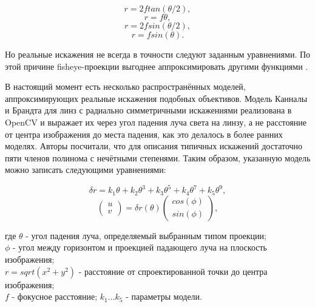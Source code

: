 \begin{eqseries}
    \begin{equation}
        \label{fy1}
    r = 2 f tan(\theta/2),  
    \end{equation}
    \begin{equation}
        \label{fy2}
    r = f \theta,
    \end{equation}
    \begin{equation}
        \label{fy3}
    r = 2 f sin(\theta/2),
    \end{equation}
    \begin{equation}
        \label{fy4}
    r = f sin(\theta).
    \end{equation}
\end{eqseries}    

Но реальные искажения не всегда в точности следуют заданным уравнениями.
По этой причине fisheye-проекции выгоднее аппроксимировать другими функциями \cite{opencv_model}.

В настоящий момент есть несколько распространённых моделей, аппроксимирующих реальные искажения подобных объективов. Модель Канналы и 
Брандта \cite{opencv_model} для линз с радиально симметричными искажениями реализована в OpenCV и выражает их через угол падения луча света на линзу, а не расстояние  
от центра изображения до места падения, как это делалось в более ранних моделях. Авторы посчитали, что для описания типичных искажений достаточно 
пяти членов полинома с нечётными степенями. Таким образом, указанную модель можно записать следующими уравнениями:
\begin{eqseries}
    \begin{equation}	
        \delta r = k_1\theta + k_2\theta^3 + k_3\theta^5 + k_4\theta^7 + k_5\theta^9,
        \label{eqn:kannala_r}
    \end{equation}
    \begin{equation}	
        \begin{pmatrix}u\\v\end{pmatrix} = \delta r(\theta)\begin{pmatrix}cos(\phi)\\sin(\phi)\end{pmatrix},
        \label{eqn:kannala_uv}
    \end{equation}
\end{eqseries}
\noindent где $\theta$ - угол падения луча, определяемый выбранным типом проекции;\\ 
\hspace{5mm} $\phi$ - угол между горизонтом и проекцией падающего луча на плоскость изображения; \\
        $r = sqrt(x^2+y^2)$ - расстояние от спроектированной точки до центра изображения; \\
        $f$ - фокусное расстояние;
        $k_1 \dots k_5$ - параметры модели.

